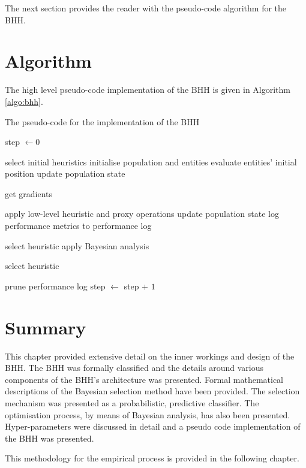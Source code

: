 The next section provides the reader with the pseudo-code algorithm for the \acs{BHH}.

\section{Algorithm}
\label{sec:bhh:algorithm}

The high level pseudo-code implementation of the \acs{BHH} is given in Algorithm \ref{algo:bhh}.

\begin{algorithm}[H]
      \caption{The pseudo-code for the implementation of the \acf{BHH}}
      \label{algo:bhh}
      \begin{algorithmic}
            \State step $\gets 0$

            \State select initial heuristics
            \State initialise population and entities
            \State evaluate entities' initial position
            \State update population state

            \State get gradients
            \EndIf

            \State apply low-level heuristic and proxy operations
            \State update population state
            \State log performance metrics to performance log

            \State select heuristic
            \Else
            \State apply Bayesian analysis
            \EndIf

            \State select heuristic
            \EndIf

            \State prune performance log
            \EndIf
            \EndIf
            \EndFor
            \State step $\gets$ step + $1$
            \EndWhile
      \end{algorithmic}
\end{algorithm}

\section{Summary}
\label{sec:bhh:summary}

This chapter provided extensive detail on the inner workings and design of the \acs{BHH}. The \acs{BHH} was formally classified and the details around various components of the \acs{BHH}'s architecture was presented. Formal mathematical descriptions of the Bayesian selection method have been provided. The selection mechanism was presented as a probabilistic, predictive classifier. The optimisation process, by means of Bayesian analysis, has also been presented. Hyper-parameters were discussed in detail and a pseudo code implementation of the \acs{BHH} was presented.

This methodology for the empirical process is provided in the following chapter.
